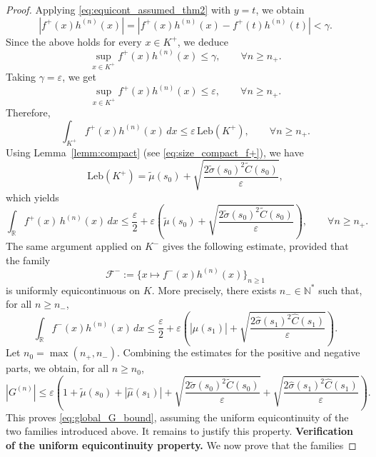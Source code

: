 \documentclass[review]{elsarticle}
\begin{document}
{\begin{proof}
Applying \eqref{eq:equicont_assumed_thm2} with $y=t$, we obtain
\begin{equation}
|f^+(x)h^{(n)}(x)|
=
|f^+(x)h^{(n)}(x)-f^+(t)h^{(n)}(t)|
<
\gamma.\end{equation}
Since the above holds for every $x\in K^+$, we deduce
\begin{equation}
\sup_{x\in K^+} f^+(x)h^{(n)}(x)\le \gamma,
\qquad \forall n\ge n_{+}.
\label{eq:sup_inside_compact_gamma_thm2}
\end{equation}
Taking $\gamma=\varepsilon$, we get
\begin{equation}
\sup_{x\in K^+} f^+(x)h^{(n)}(x)\le \varepsilon,
\qquad \forall n\ge n_{+}.
\label{eq:sup_inside_compact_thm2}
\end{equation}
Therefore,
\begin{equation}
\int_{K^+} f^+(x)h^{(n)}(x)\,dx
\le
\varepsilon\,\mathrm{Leb}(K^+),
\qquad \forall n\ge n_{+}.
\label{eq:int_inside_compact_thm2}
\end{equation}
%
Using Lemma~\ref{lemm:compact} (see \eqref{eq:size_compact_f+}), we have
$$
\mathrm{Leb}(K^+)
=
\widetilde{\mu}(s_0)+\sqrt{\frac{2\widetilde{\sigma}(s_0)^2\widetilde{C}(s_0)}{\varepsilon}},
$$
which yields
\begin{equation}\label{eq:int_f+_thm2}
\int_{\mathbb{R}} f^+(x)\, h^{(n)}(x) \, dx
\le
\frac{\varepsilon}{2}
+
\varepsilon\left(\widetilde{\mu}(s_0)+\sqrt{\frac{2\widetilde{\sigma}(s_0)^2\widetilde{C}(s_0)}{\varepsilon}}\right),
\qquad \forall n\ge n_{+}.
\end{equation}
%
The same argument applied on $K^-$ gives the following estimate, provided that the family
$$
\mathcal F^-:=\{x\mapsto f^-(x)h^{(n)}(x)\}_{n\ge 1}
$$
is uniformly equicontinuous on $K$. More precisely, there exists $n_-\in\mathbb N^*$ such that, for all $n\ge n_-$,
$$
\int_{\mathbb R} f^-(x)h^{(n)}(x)\,dx
\le
\frac{\varepsilon}{2}
+
\varepsilon\left(
|\widehat{\mu}(s_1)|
+
\sqrt{\frac{2\widehat{\sigma}(s_1)^2\widehat C(s_1)}{\varepsilon}}
\right).
$$
Let $n_0=\max(n_+,n_-)$. Combining the estimates for the positive and negative parts, we obtain, for all $n\ge n_0$,
$$
|G^{(n)}|
\le
\varepsilon
\left(
1
+
\widetilde{\mu}(s_0)
+
|\widehat{\mu}(s_1)|
+
\sqrt{\frac{2\widetilde{\sigma}(s_0)^2\widetilde C(s_0)}{\varepsilon}}
+
\sqrt{\frac{2\widehat{\sigma}(s_1)^2\widehat C(s_1)}{\varepsilon}}
\right).
$$
This proves \eqref{eq:global_G_bound}, assuming the uniform equicontinuity of the two families introduced above. It remains to justify this property.
%
\smallskip
\noindent\textbf{Verification of the uniform equicontinuity property.} We now prove that the families

\end{proof}}
\end{document}
